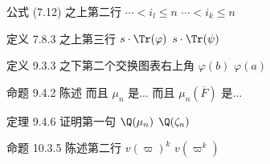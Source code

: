 \documentclass{AJerrata}
\begin{document}
\begin{Errata}
		\item[公式 (7.12) 之上第二行]
		\Orig $\cdots < i_l \leq n$
		\Corr $\cdots < i_k \leq n$
		
		\item[定义 7.8.3 之上第三行]
		\Orig $s \cdot \Tr(\varphi)$
		\Corr $s \cdot \Tr(\psi)$
		
		\item[定义 9.3.3 之下第二个交换图表右上角]
		\Orig $\varphi(b)$
		\Corr $\varphi(a)$
		
		\item[命题 9.4.2 陈述]
		\Orig 而且 $\mu_n$ 是...
		\Corr 而且 $\mu_n(\overline{F})$ 是...
		
		\item[定理 9.4.6 证明第一句]
		\Orig $\Q(\mu_n)$
		\Corr $\Q(\zeta_n)$
		
		\item[命题 10.3.5 陈述第二行]
		\Orig $v(\varpi)^k$
		\Corr $v(\varpi^k)$
	\end{Errata}
\end{document}
